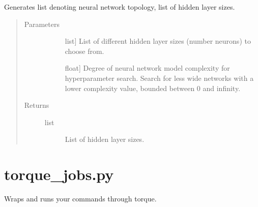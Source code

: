 \documentclass[letterpaper,10pt,english]{sphinxmanual}
\begin{document}
\begin{fulllineitems}
\label{\detokenize{index:methylnet.hyperparameter_scans.generate_topology}}
Generates list denoting neural network topology, list of hidden layer sizes.
\begin{quote}\begin{description}
\item[{Parameters}] \leavevmode\begin{description}
\item[{}] \leavevmode{[}list{]}
List of different hidden layer sizes (number neurons) to choose from.

\item[{}] \leavevmode{[}float{]}
Degree of neural network model complexity for hyperparameter search. Search for less wide networks with a lower complexity value, bounded between 0 and infinity.

\end{description}

\item[{Returns}] \leavevmode\begin{description}
\item[{list}] \leavevmode
List of hidden layer sizes.

\end{description}

\end{description}\end{quote}

\end{fulllineitems}

\label{\detokenize{index:module-methylnet.torque_jobs}}

\chapter{torque\_jobs.py}
\label{\detokenize{index:torque-jobs-py}}
Wraps and runs your commands through torque.
\end{document}
